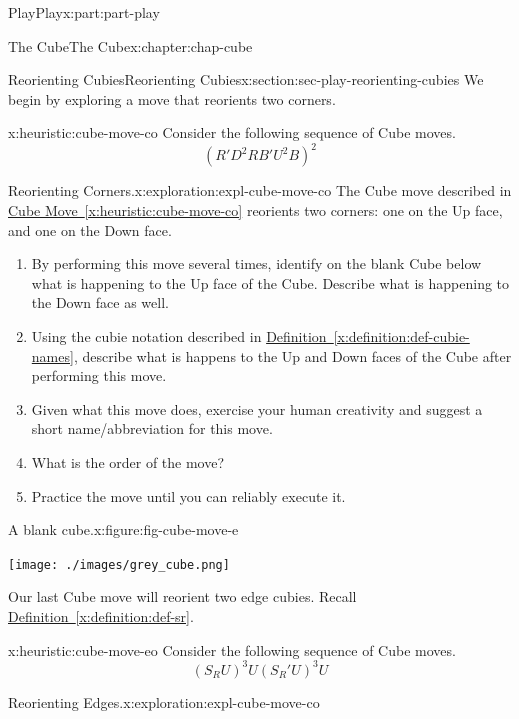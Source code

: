 \documentclass[oneside,10pt,]{book}
\newcommand{\xreffont}{\relax}
\numberwithin{equation}{section}
\begin{document}
\begin{partptx}{Play}{}{Play}{}{}{x:part:part-play}
\begin{chapterptx}{The Cube}{}{The Cube}{}{}{x:chapter:chap-cube}
\begin{sectionptx}{Reorienting Cubies}{}{Reorienting Cubies}{}{}{x:section:sec-play-reorienting-cubies}
We begin by exploring a move that reorients two corners.%
\begin{heuristic}{}{}{x:heuristic:cube-move-co}%
%
Consider the following sequence of Cube moves.%
%
\begin{equation*}
(R' D^2 R B' U^2 B)^2
\end{equation*}
\end{heuristic}
\begin{exploration}{Reorienting Corners.}{x:exploration:expl-cube-move-co}%
The Cube move described in \hyperref[x:heuristic:cube-move-co]{Cube Move~{\xreffont\ref{x:heuristic:cube-move-co}}} reorients two corners: one on the Up face, and one on the Down face.%
%
\begin{enumerate}
\item{}By performing this move several times, identify on the blank Cube below what is happening to the Up face of the Cube. Describe what is happening to the Down face as well.%
\item{}Using the cubie notation described in \hyperref[x:definition:def-cubie-names]{Definition~{\xreffont\ref{x:definition:def-cubie-names}}}, describe what is happens to the Up and Down faces of the Cube after performing this move.%
\item{}Given what this move does, exercise your human creativity and suggest a short name\slash{}abbreviation for this move.%
\item{}What is the order of the move?%
\item{}Practice the move until you can reliably execute it.%
\end{enumerate}
\begin{figureptx}{A blank cube.}{x:figure:fig-cube-move-e}{}%
\begin{image}{0.25}{0.5}{0.25}%
\texttt{[image: ./images/grey\_cube.png]}
\end{image}%
\tcblower
\end{figureptx}%
\end{exploration}%
Our last Cube move will reorient two edge cubies. Recall \hyperref[x:definition:def-sr]{Definition~{\xreffont\ref{x:definition:def-sr}}}.%
\begin{heuristic}{}{}{x:heuristic:cube-move-eo}%
%
Consider the following sequence of Cube moves.%
%
\begin{equation*}
(S_R U)^3 U (S_R ' U)^3 U
\end{equation*}
\end{heuristic}
\begin{exploration}{Reorienting Edges.}{x:exploration:expl-cube-move-co}%

\end{exploration}
\end{sectionptx}
\end{chapterptx}
\end{partptx}
\end{document}
